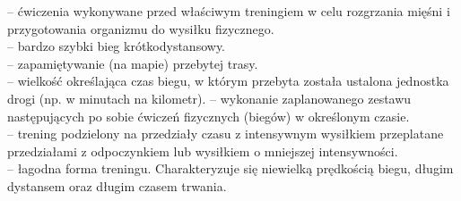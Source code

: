 	-- ćwiczenia wykonywane przed właściwym treningiem w celu rozgrzania mięśni i przygotowania organizmu do wysiłku fizycznego.\\
	-- bardzo szybki bieg krótkodystansowy.\\
	-- zapamiętywanie (na mapie) przebytej trasy.\\
	-- wielkość określająca czas biegu, w którym przebyta została ustalona jednostka drogi (np. w minutach na kilometr).
	-- wykonanie zaplanowanego zestawu następujących po sobie ćwiczeń fizycznych (biegów) w określonym czasie. \\
	-- trening podzielony na przedziały czasu z intensywnym wysiłkiem przeplatane przedziałami z odpoczynkiem lub wysiłkiem o mniejszej intensywności.\\
	-- łagodna forma treningu. Charakteryzuje się niewielką prędkością biegu, długim dystansem oraz długim czasem trwania.\\


